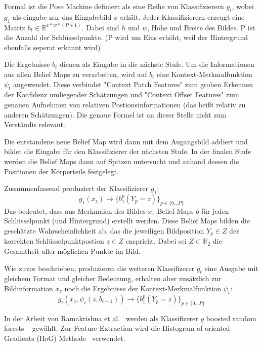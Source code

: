 \documentclass[journal, a4paper]{IEEEtran}
\begin{document}
        Formal ist die Pose Machine definiert als eine Reihe von Klassifizierern $g_t$, wobei $g_1$ als eingabe nur das Eingabebild $x$ erhält. Jeder Klassifizierern erzeugt eine Matrix $b_{t}\in\mathbb{R}^{x*w*(P+1)}$. Dabei sind $h$ und $w$, Höhe und Breite des Bildes. P ist die Anzahl der Schlüsselpunkte. (P wird um Eins erhöht, weil der Hintergrund ebenfalls seperat erkannt wird)

        Die Ergebnisse $b_t$ dienen als Eingabe in die nächste Stufe. 
        Um die Informationen aus allen Belief Maps zu verarbeiten, wird auf $b_t$ eine Kontext-Merkmalfunktion $\psi_t$ angewendet. Diese verbindet "Context Patch Features" zum groben Erkennen der Konfidenz umliegender Schätzungen und "Context Offset Features" zum genauen Aufnehmen von relativen Postionsinformationen (das heißt relativ zu anderen Schätzungen). Die genaue Formel ist an dieser Stelle nicht zum Verständis relevant. %

        Die entstandene neue Belief Map wird dann mit dem Augangsbild addiert und bildet die Eingabe für den Klassifizierer der nächsten Stufe. In der finalen Stufe werden die Belief Maps dann auf Spitzen untersucht und anhand dessen die Positionen der Körperteile festgelegt.

        Zusammenfassend produziert der Klassifizierer $g_1$:
        \[ g_1(x_z) \rightarrow \{b_{1}^{p}(Y_p = z) \}_{p \in \{0 \ldots P\}} \] 
        Das bedeutet, dass aus Merkmalen des Bildes $x_z$ Belief Maps $b$ für jeden Schlüsselpunkt (und Hintergrund) erstellt werden. Diese Belief Maps bilden die geschätzte Wahrscheinlichkeit ab, das die jeweiligen Bildposition $Y_p \in Z$ der korrekten Schlüsselpunktpostion $z \in Z$ enspricht. Dabei sei $Z \subset \mathbb{R}_2$ die Gesamtheit aller möglichen Punkte im Bild.

        Wie zuvor beschrieben, produzieren die weiteren Klassifizerer $g_t$ eine Ausgabe mit gleichem Format und gleicher Bedeutung, erhalten aber zusätzlich zur Bildinformation $x_z$ noch die Ergebnisse der Kontext-Merkmalfunktion $\psi_t$:
        \[ g_t(x_z,\psi_t(z,b_{t-1})) \rightarrow \{b_{1}^{p}(Y_p = z) \}_{p \in \{0 \ldots P\}} \] 

        In der Arbeit von Ramakrishna et al.~\cite{ramakrishna2014pose} werden als Klassifizerer $g$ boosted random forests ~\cite{breiman2001,friedman2001greedy} gewählt. Zur Feature Extraction wird die Histogram of oriented Gradients (HoG) Methode~\cite{dalal2005histograms} verwendet.
\end{document}
